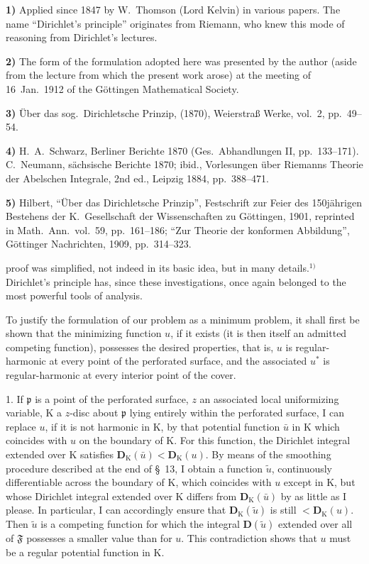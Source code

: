 \documentclass{article}
\begin{document}
\textbf{1)} Applied since 1847 by W.~Thomson (Lord Kelvin) in various papers. The name ``Dirichlet's principle'' originates from Riemann, who knew this mode of reasoning from Dirichlet's lectures.

\textbf{2)} The form of the formulation adopted here was presented by the author (aside from the lecture from which the present work arose) at the meeting of 16~Jan.~1912 of the Göttingen Mathematical Society.

\textbf{3)} Über das sog.\ Dirichletsche Prinzip, (1870), Weierstraß Werke, vol.~2, pp.~49--54.

\textbf{4)} H.~A.~Schwarz, Berliner Berichte 1870 (Ges.\ Abhandlungen II, pp.~133--171). C.~Neumann, sächsische Berichte 1870; ibid., Vorlesungen über Riemanns Theorie der Abelschen Integrale, 2nd ed., Leipzig 1884, pp.~388--471.

\textbf{5)} Hilbert, ``Über das Dirichletsche Prinzip'', Festschrift zur Feier des 150jährigen Bestehens der K.~Gesellschaft der Wissenschaften zu Göttingen, 1901, reprinted in Math.\ Ann.\ vol.~59, pp.~161--186; ``Zur Theorie der konformen Abbildung'', Göttinger Nachrichten, 1909, pp.~314--323.

proof was simplified, not indeed in its basic idea, but in many details.${}^{1)}$ Dirichlet's principle has, since these investigations, once again belonged to the most powerful tools of analysis.

To justify the formulation of our problem as a minimum problem, it shall first be shown that the minimizing function $u$, if it exists (it is then itself an admitted competing function), possesses the desired properties, that is, $u$ is regular-harmonic at every point of the perforated surface, and the associated $u^*$ is regular-harmonic at every interior point of the cover.

1. If $\mathfrak{p}$ is a point of the perforated surface, $z$ an associated local uniformizing variable, $\mathrm{K}$ a $z$-disc about $\mathfrak{p}$ lying entirely within the perforated surface, I can replace $u$, if it is not harmonic in $\mathrm{K}$, by that potential function $\bar{u}$ in $\mathrm{K}$ which coincides with $u$ on the boundary of $\mathrm{K}$. For this function, the Dirichlet integral extended over $\mathrm{K}$ satisfies $\mathbf{D}_{\mathrm{K}}(\bar{u}) < \mathbf{D}_{\mathrm{K}}(u)$. By means of the smoothing procedure described at the end of §~13, I obtain a function $\tilde{u}$, continuously differentiable across the boundary of $\mathrm{K}$, which coincides with $u$ except in $\mathrm{K}$, but whose Dirichlet integral extended over $\mathrm{K}$ differs from $\mathbf{D}_{\mathrm{K}}(\bar{u})$ by as little as I please. In particular, I can accordingly ensure that $\mathbf{D}_{\mathrm{K}}(\tilde{u})$ is still $< \mathbf{D}_{\mathrm{K}}(u)$. Then $\tilde{u}$ is a competing function for which the integral $\mathbf{D}(\tilde{u})$ extended over all of $\mathfrak{F}$ possesses a smaller value than for $u$. This contradiction shows that $u$ must be a regular potential function in $\mathrm{K}$.
\end{document}
